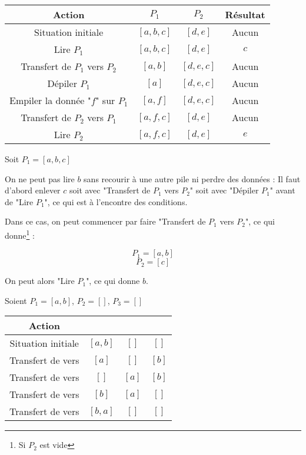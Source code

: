 

\begin{center}
	\begin{tabular}{|c | c | c | c|} 
		\hline
		Action & $P_1$ & $P_2$ & Résultat \\ 
		\hline
		Situation initiale & $[a,b,c]$ & $[d,e]$ & Aucun \\ 
		\hline
		Lire $P_1$ & $[a,b,c]$ & $[d,e]$ & $c$ \\
		\hline
		Transfert de $P_1$ vers $P_2$ & $[a,b]$ & $[d,e,c]$ & Aucun \\
		\hline
		Dépiler $P_1$ & $[a]$ & $[d,e,c]$ & Aucun \\
		\hline
		Empiler la donnée "$f$" sur $P_1$ & $[a,f]$ & $[d,e,c]$ & Aucun \\
		\hline
		Transfert de $P_2$ vers $P_1$ & $[a,f,c]$ & $[d,e]$ & Aucun \\
		\hline
		Lire $P_2$ & $[a,f,c]$ & $[d,e]$ & $e$\\
		\hline
	\end{tabular}
\end{center}

Soit $P_1 = [a,b,c]$

On ne peut pas lire $b$ sans recourir à une autre pile ni perdre des données : Il faut d'abord enlever $c$ soit avec "Transfert de $P_1$ vers $P_2$" soit avec "Dépiler $P_1$" avant de "Lire $P_1$", ce qui est à l'encontre des conditions.

Dans ce cas, on peut commencer par faire "Transfert de $P_1$ vers $P_2$", ce qui donne\footnote{Si $P_2$ est vide} :

\[P_1 = [a,b]\]
\[P_2 = [c]\]

On peut alors "Lire $P_1$", ce qui donne $b$.

Soient $P_1 = [a,b]$, $P_2 = []$, $P_3=[]$

\begin{center}
	\begin{tabular}{| c | c | c | c |}
		\hline
		Action & \pun & \pdeux & \ptrois \\
		\hline
		Situation initiale & $[a,b]$ & $[]$ & $[]$ \\
		\hline
		Transfert de \pun vers \ptrois & $[a]$ & $[]$ & $[b]$ \\
		\hline
		Transfert de \pun vers \pdeux & $[]$ & $[a]$ & $[b]$ \\
		\hline
		Transfert de \ptrois vers \pun & $[b]$ & $[a]$ & $[]$ \\
		\hline
		Transfert de \pdeux vers \pun & $[b,a]$ & $[]$ & $[]$ \\
		\hline
	\end{tabular}
\end{center}

